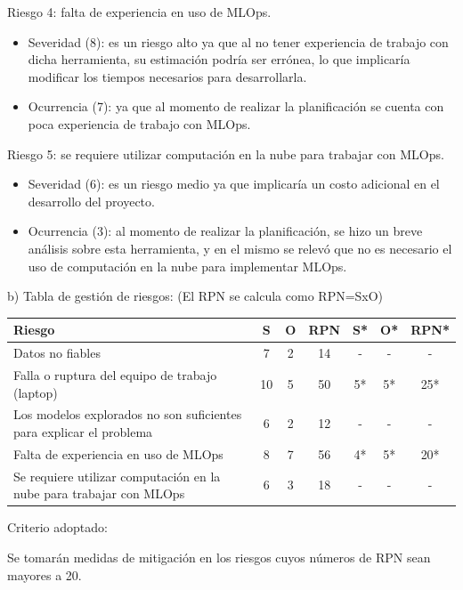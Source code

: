 \documentclass[
11pt, %
]{charter}
\begin{document}
Riesgo 4: falta de experiencia en uso de MLOps.
\begin{itemize}
	\item Severidad (8): es un riesgo alto ya que al no tener experiencia de trabajo con dicha herramienta, su estimación podría ser errónea, lo que implicaría modificar los tiempos necesarios para desarrollarla.
	\item Ocurrencia (7): ya que al momento de realizar la planificación se cuenta con poca experiencia de trabajo con MLOps. 
\end{itemize}

Riesgo 5: se requiere utilizar computación en la nube para trabajar con MLOps.
\begin{itemize}
	\item Severidad (6): es un riesgo medio ya que implicaría un costo adicional en el desarrollo del proyecto.
	\item Ocurrencia (3): al momento de realizar la planificación, se hizo un breve análisis sobre esta herramienta, y en el mismo se relevó que no es necesario el uso de computación en la nube para implementar MLOps. 
\end{itemize}


b) Tabla de gestión de riesgos:      (El RPN se calcula como RPN=SxO)

\begin{table}[htpb]
\centering
\begin{tabularx}{\linewidth}{@{}|X|c|c|c|c|c|c|@{}}
\hline
\rowcolor[HTML]{C0C0C0} 
Riesgo & S & O & RPN & S* & O* & RPN* \\ \hline
Datos no fiables       &  7  &  2  &  14   & - & - & - \\ \hline
Falla o ruptura del equipo de trabajo (laptop) & 10 & 5 &  50   & 5* & 5* & 25* \\ \hline
Los modelos explorados no son suficientes para explicar el problema & 6 & 2 & 12 & - & - & - \\ \hline
Falta de experiencia en uso de MLOps & 8 &  7  &  56   &  4*  & 5* & 20* \\ \hline
Se requiere utilizar computación en la nube para trabajar con MLOps       & 6 & 3  & 18 & - & - & - \\ \hline
\end{tabularx}%
\end{table}

Criterio adoptado: 

Se tomarán medidas de mitigación en los riesgos cuyos números de RPN sean mayores a 20.
\end{document}
